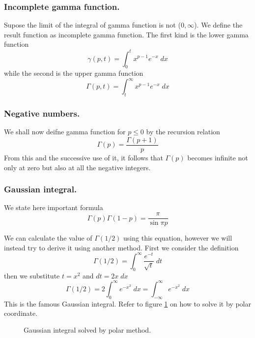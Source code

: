 \documentclass[../../main.tex]{subfiles}
\begin{document}
\subsubsection{Incomplete gamma function.} Supose the limit of the integral of gamma function is not ($0,\infty$). We define the result function as incomplete gamma function. The first kind is the lower gamma function 
\begin{equation*}
    \gamma (p,t)=\int_{0}^{t}x^{p-1}e^{-x}\;dx
\end{equation*}
while the second is the upper gamma function
\begin{equation*}
    \Gamma (p,t)=\int_{t }^{\infty}x^{p-1}e^{-x}\;dx
\end{equation*}

\subsubsection{Negative numbers.} We shall now deifne gamma function for $p\leq 0$ by the recursion 
relation 
\begin{equation*}
    \Gamma(p)=\frac{\Gamma(p+1)}{p}
\end{equation*}
From this and the successive use of it, it follows that $\Gamma(p)$ becomes infinite not only at zero but also at all the negative integers.

\subsubsection{Gaussian integral.} We state here important formula
\begin{equation*}
    \Gamma(p)\Gamma(1-p)=\frac{\pi}{\sin \pi p}
\end{equation*}

We can calculate the value of $\Gamma(1/2)$ using this equation, however we will instead try to derive it using another method. First we consider the definition
\begin{equation*}
    \Gamma(1/2)=\int_{0}^{\infty}\frac{e^{-t}}{\sqrt{t}}\;dt
\end{equation*}
then we substitute $t=x^2$ and $dt=2x\;dx$
\begin{equation*}
    \Gamma(1/2)=2\int_{0}^{\infty}e^{-x^2}\;dx=\int_{-\infty}^{\infty}e^{-x^2}\;dx
\end{equation*}
This is the famous Gaussian integral. Refer to figure \ref{fig} on how to solve it by polar coordinate. 

\begin{figure}
    \centering
    \caption{Gaussian integral solved by polar method.}
    \label{fig}
\end{figure}
\end{document}

